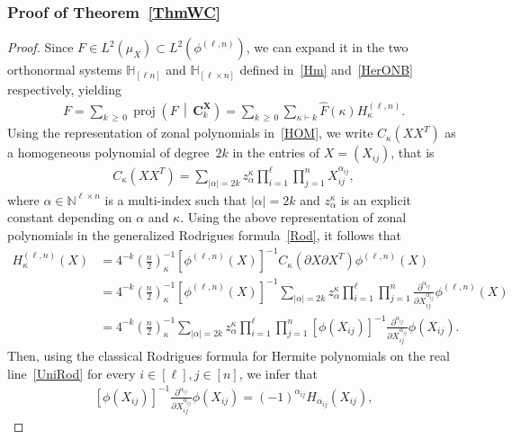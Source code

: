 \documentclass[10pt]{amsart}
\theoremstyle{definition}\newtheorem{defi}[theo]{Definition}\newtheorem{rema}[theo]{Remark}\newtheorem{exam}[theo]{Example}\newtheorem{exem}[theo]{Example}\newtheorem{nota}[theo]{Notation}
\DeclareMathOperator{\proj}{proj}
\newcommand{\bfX}{\mathbf{X}}
\newcommand{\bfC}{\mathbf{C}}
\newcommand{\N}{\mathbb{N}}
\newcommand{\bbH}{\mathbb{H}}
\begin{document}
\subsubsection*{Proof of Theorem~\ref{ThmWC}}
\begin{proof}
Since $F \in L^2(\mu_X) \subset L^2(\phi^{(\ell,n)})$, we can expand it in the two orthonormal systems $\bbH_{[\ell n]}$ and $\bbH_{[\ell \times n]}$ defined in~\eqref{Hm} and~\eqref{HerONB} respectively, yielding
\begin{gather}\label{WCEq}
F=\sum_{k\,\geq\,0} \proj\left(F\,\middle|\,\bfC_k^{\bfX}\right) = \sum_{k\,\geq\,0} \sum_{\kappa \vdash k}
\widehat{F}(\kappa) H_{\kappa}^{(\ell,n)}.
\end{gather}
Using the representation of zonal polynomials in~\eqref{HOM}, we write $C_{\kappa}(XX^T)$ as a homogeneous polynomial of degree~$2k$ in the entries of $X=(X_{ij})$, that is
\begin{gather*}
C_{\kappa}\left(XX^T\right) = \sum_{|\alpha|=2k} z_{\alpha}^{\kappa} \prod_{i=1}^{\ell} \prod_{j=1}^n X_{ij}^{\alpha_{ij}},
\end{gather*}
where $\alpha\in \N^{\ell \times n}$ is a multi-index such that $|\alpha|=2k$ and $z_{\alpha}^{\kappa}$ is an explicit constant depending on $\alpha$ and $\kappa$. Using the above representation of zonal polynomials in the generalized Rodrigues formula~\eqref{Rod}, it follows that
\begin{align*}
H_{\kappa}^{(\ell,n)}(X) &= 4^{-k} \left(\frac{n}{2}\right)_{\kappa}^{-1} \left[\phi^{(\ell,n)}(X)\right]^{-1} C_{\kappa}\left(\partial X\partial X^T\right) \phi^{(\ell,n)}(X) \\
&= 4^{-k} \left(\frac{n}{2}\right)_{\kappa}^{-1} \left[\phi^{(\ell,n)}(X)\right]^{-1} \sum_{|\alpha|=2k} z_{\alpha}^{\kappa} \prod_{i=1}^{\ell} \prod_{j=1}^n \frac{\partial^{\alpha_{ij}}}{\partial X_{ij}^{\alpha_{ij}}} \phi^{(\ell,n)}(X) \\
&= 4^{-k} \left(\frac{n}{2}\right)_{\kappa}^{-1} \sum_{|\alpha|=2k} z_{\alpha}^{\kappa} \prod_{i=1}^{\ell} \prod_{j=1}^n \left[\phi(X_{ij})\right]^{-1} \frac{\partial^{\alpha_{ij}}}{\partial X_{ij}^{\alpha_{ij}}} \phi(X_{ij}).
\end{align*}
Then, using the classical Rodrigues formula for Hermite polynomials on the real line~\eqref{UniRod} for every $i\in [\ell], j\in [n]$, we infer that
\begin{gather*}
\left[\phi(X_{ij})\right]^{-1} \frac{\partial^{\alpha_{ij}}}{\partial X_{ij}^{\alpha_{ij}}} \phi(X_{ij}) = (-1)^{\alpha_{ij}} H_{\alpha_{ij}}(X_{ij}),

\end{gather*}
\end{proof}
\end{document}
